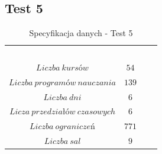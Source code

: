 \subsection{Test 5}
\begin{table}[H]
\begin{center}

\begin{tabular}{ |c|c|c|c| }
\multicolumn{1}{r}{}
 &  \multicolumn{1}{c}{$$}
 & \multicolumn{1}{c}{$$} 
 \\
\cline{1-2}
$Liczba\ kursów$ & $54$\\
\cline{1-2}
$Liczba\ programów\ nauczania$ & $139$\\
\cline{1-2}
$Liczba\ dni$ & $6$ \\
\cline{1-2}
$Licza\ przedziałów\ czasowych$ & $6$ \\
\cline{1-2}
$Liczba\ ograniczeń$ & $771$ \\
\cline{1-2}
$Liczba\ sal$ & $9$ \\
\cline{1-2}
\end{tabular}
\end{center}
\caption {Specyfikacja danych - Test 5}
\end{table}



